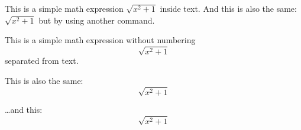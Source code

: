 \documentclass{article}
\begin{document}
This is a simple math expression \(\sqrt{x^2+1}\) inside text. 
And this is also the same: 
\begin{math}
\sqrt{x^2+1}
\end{math}
but by using another command.

This is a simple math expression without numbering
\[\sqrt{x^2+1}\] 
separated from text.

This is also the same:
\begin{displaymath}
\sqrt{x^2+1}
\end{displaymath}

\ldots and this:
\begin{equation*}
\sqrt{x^2+1}
\end{equation*}
\end{document}
